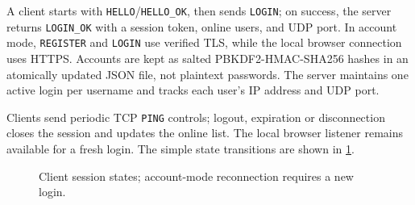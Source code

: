 A client starts with \texttt{HELLO}/\texttt{HELLO\_OK}, then sends \texttt{LOGIN}; on success, the server returns \texttt{LOGIN\_OK} with a session token, online users, and UDP port. In account mode, \texttt{REGISTER} and \texttt{LOGIN} use verified TLS, while the local browser connection uses HTTPS. Accounts are kept as salted PBKDF2-HMAC-SHA256 hashes in an atomically updated JSON file, not plaintext passwords. The server maintains one active login per username and tracks each user's IP address and UDP port.

Clients send periodic TCP \texttt{PING} controls; logout, expiration or disconnection closes the session and updates the online list. The local browser listener remains available for a fresh login. The simple state transitions are shown in \cref{fig:session-state}.

\begin{figure}[H]
 \centering
 \caption{Client session states; account-mode reconnection requires a new login.}
 \label{fig:session-state}
\end{figure}
